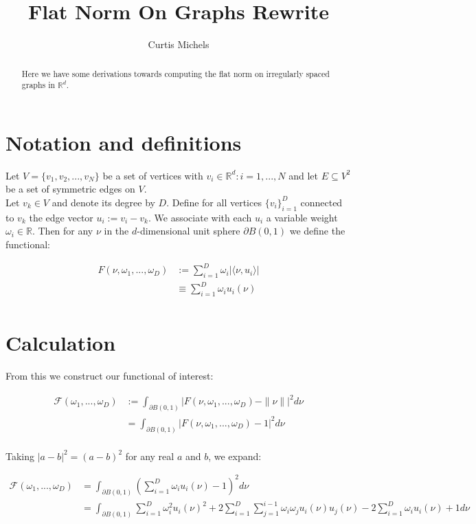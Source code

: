 \documentclass[12pt]{article}
\title{Flat Norm On Graphs Rewrite}
\author{Curtis Michels}
\begin{document}
\maketitle

\begin{abstract}
Here we have some derivations towards computing the flat norm on irregularly spaced graphs in $\mathbb{R}^d$.
\end{abstract}

\section{Notation and definitions}

Let $V = \{v_1,v_2,...,v_N\}$ be a set of vertices with $v_i \in \mathbb{R}^d: i = 1,...,N$ and let $E \subseteq V^2$ be a set of symmetric edges on $V$.\\

Let $v_k \in V$ and denote its degree by $D$. Define for all vertices $\{v_i\}_{i=1}^D$ connected to $v_k$ the edge vector $u_i := v_i-v_k$. We associate with each $u_i$ a variable weight $\omega_i \in \mathbb{R}$. Then for any $\nu$ in the $d$-dimensional unit sphere $\partial B(0,1)$ we define the functional:

\begin{align*}
	F(\nu,\omega_1,...,\omega_D) &:= \sum_{i=1}^D \omega_i |\langle \nu,u_i \rangle|\\
	&\equiv \sum_{i=1}^D \omega_i u_i(\nu)\\
\end{align*}

\section{Calculation}

From this we construct our functional of interest:

\begin{align*}
	\mathcal{F}(\omega_1,...,\omega_D) &:= \int_{\partial B(0,1)} |F(\nu,\omega_1,...,\omega_D) - \|\nu\||^2 d \nu\\
	&= \int_{\partial B(0,1)} |F(\nu,\omega_1,...,\omega_D) - 1|^2 d \nu\\
\end{align*}

Taking $|a-b|^2 = (a-b)^2$ for any real $a$ and $b$, we expand:

\begin{align*}
	\mathcal{F}(\omega_1,...,\omega_D) &= \int_{\partial B(0,1)} \left(\sum_{i=1}^D \omega_i u_i(\nu) - 1\right)^2d\nu\\
	&= \int_{\partial B(0,1)} \sum_{i=1}^D \omega_i^2 u_i(\nu)^2 + 2 \sum_{i=1}^D \sum_{j=1}^{i-1}\omega_i \omega_j  u_i(\nu) u_j(\nu) - 2\sum_{i=1}^D \omega_i u_i(\nu) + 1d\nu
\end{align*}
\end{document}
